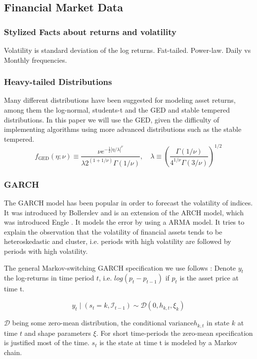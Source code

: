 \documentclass[11pt,a4paper]{article}
\begin{document}
\subsection{Financial Market Data}

\subsubsection{Stylized Facts about returns and volatility}
Volatility is standard deviation of the log returns.
Fat-tailed. Power-law. Daily vs Monthly frequencies. 

\subsubsection{Heavy-tailed Distributions}
Many different distributions have been suggested for modeling asset returns, among them the log-normal, students-t and the \ac{GED} and stable tempered distributions.
In this paper we will use the \ac{GED}, given the difficulty of implementing algorithms using more advanced distributions such as the stable tempered.
$$f_{\mathrm{GED}}(\eta ; \nu) \equiv \frac{\nu e^{-\frac{1}{2}|\eta / \lambda|^\nu}}{\lambda 2^{(1+1 / \nu)} \Gamma(1 / \nu)}, \quad \lambda \equiv\left(\frac{\Gamma(1 / \nu)}{4^{1 / \nu} \Gamma(3 / \nu)}\right)^{1 / 2}$$

\subsubsection{GARCH}
\label{sss:GARCH}
The \ac{GARCH} model has been popular in order to forecast the volatility of indices. It was introduced  by Bollerslev \cite{bollerslev_generalized_1986} and is an extension of the ARCH model, which was introduced Engle \cite{engle_autoregressive_1982}. It models the error by using a \ac{ARMA} model.
It tries to explain the observation that the volatility of financial assets tends to be heteroskedastic and cluster, i.e. periods with high volatility are followed by periods with high volatility.

The general Markov-switching GARCH specification we use follows \cite{ardia_markov-switching_2019}: 
Denote $y_t$ the log-returns in time period $t$, i.e. $log(p_t-p_{t-1})$ if $p_t$ is the asset price at time t.

$$y_{t} \mid\left(s_{t}=k, \mathcal{I}_{t-1}\right) \sim \mathcal{D}\left(0, h_{k, t}, \xi_{k}\right)$$

$\mathcal{D}$ being some zero-mean distribution, the conditional variance$h_{k,t}$ in state $k$ at time $t$ and shape parameters $\xi$. For short time-periods the zero-mean specification is justified most of the time.  $s_t$ is the state at time t is modeled by a Markov chain.\\
\end{document}
